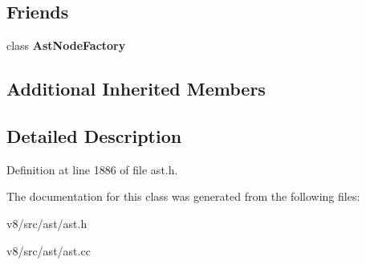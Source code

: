 \subsection*{Friends}
\begin{DoxyCompactItemize}
\item 
\mbox{\label{classv8_1_1internal_1_1CallRuntime_a8d587c8ad3515ff6433eb83c578e795f}} 
class {\bfseries Ast\+Node\+Factory}
\end{DoxyCompactItemize}
\subsection*{Additional Inherited Members}


\subsection{Detailed Description}


Definition at line 1886 of file ast.\+h.



The documentation for this class was generated from the following files\+:\begin{DoxyCompactItemize}
\item 
v8/src/ast/ast.\+h\item 
v8/src/ast/ast.\+cc\end{DoxyCompactItemize}
